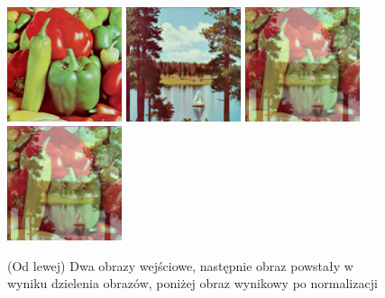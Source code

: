 \documentclass[final,a4paper,openany,12pt]{mwbk}
\begin{document}
\begin{figure}[H]
	\begin{center}
		\includegraphics[width=0.3\textwidth]{1/1Color_Div_Img1_Original}
		\includegraphics[width=0.3\textwidth]{1/1Color_Div_Img2_Original}
		\includegraphics[width=0.3\textwidth]{1/1Color_Div_Img_Result}
		\includegraphics[width=0.3\textwidth]{1/1Color_Div_Img_Result_Norm}
	\end{center}
	\caption{(Od lewej) Dwa obrazy wejściowe, następnie obraz powstały w wyniku dzielenia obrazów, poniżej obraz wynikowy po normalizacji }
\end{figure}
\end{document}
